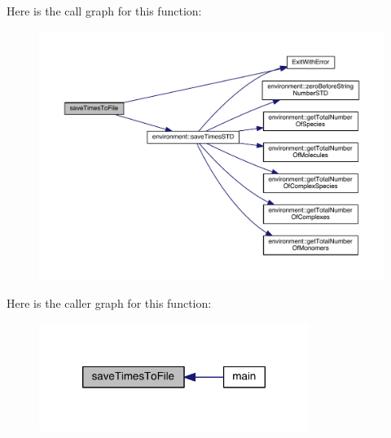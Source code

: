 Here is the call graph for this function\-:
\nopagebreak
\begin{figure}[H]
\begin{center}
\leavevmode
\includegraphics[width=350pt]{a00068_a2bf310904bc4e1fb5669e548525c4ba7_cgraph}
\end{center}
\end{figure}




Here is the caller graph for this function\-:
\nopagebreak
\begin{figure}[H]
\begin{center}
\leavevmode
\includegraphics[width=248pt]{a00068_a2bf310904bc4e1fb5669e548525c4ba7_icgraph}
\end{center}
\end{figure}


